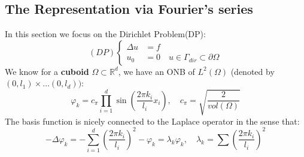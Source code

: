 \subsection{The Representation via Fourier's series}
In this section we focus on the Dirichlet Problem(DP):
\begin{equation}\label{PE:DP(simple)}
(DP)\left\{
\begin{aligned}
	\Delta u &= f \\
	u_0 &= 0 \quad u \in \Gamma_{dir} \subset \partial\Omega
\end{aligned}
\right.	
\end{equation} 
We know for a \textbf{cuboid} $\Omega \subset \mathbb{R}^d$, we have an ONB of $L^2(\Omega)$ (denoted by $(0, l_1)\times \dots (0, l_d)) $:
\begin{equation}
	\varphi_k = c_\pi \prod_{i = 1}^d \sin(\frac{2\pi k_i}{l_i}x_i)	, \quad c_\pi = \sqrt{\frac{2}{vol(\Omega)}}
\end{equation} 
The basis function is nicely connected to the Laplace operator in the sense that:
\begin{equation*}
	-\Delta \varphi_k = -\sum_{i = 1}^d (\frac{2\pi k_i}{l_i})^2-\varphi_k = \lambda_k \varphi_k, \quad \lambda_k = \sum (\frac{2\pi k_i}{l_i})^2
\end{equation*}


